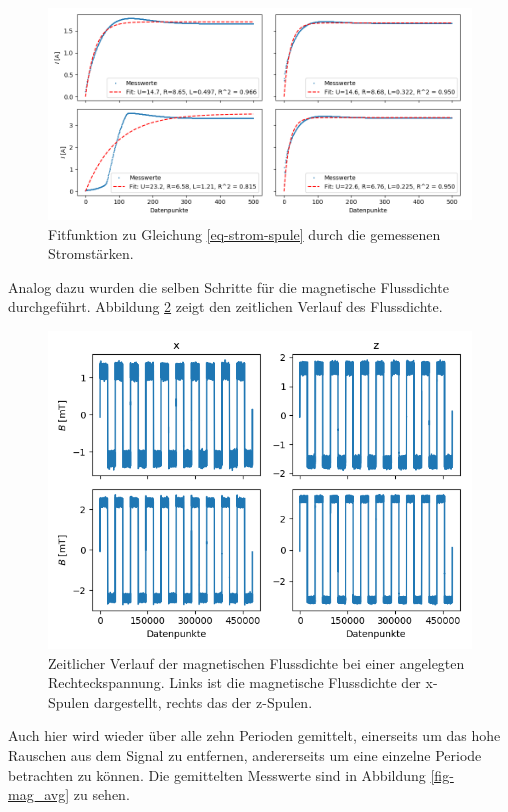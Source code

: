 \documentclass[page,pdftex,12pt,a4paper,twoside,openright]{scrbook}
\begin{document}
\begin{figure}[h]
\centering
\includegraphics[width=\textwidth]{img/strom_fit.png}
\caption{\label{fig-stromfit}
Fitfunktion zu Gleichung \ref{eq-strom-spule} durch die gemessenen Stromstärken.}
\end{figure}


Analog dazu wurden die selben Schritte für die magnetische Flussdichte durchgeführt. Abbildung \ref{fig-mag} zeigt den zeitlichen Verlauf des Flussdichte.

\begin{figure}[H]
\centering
\includegraphics[width=\textwidth]{img/mag.png}
\caption{\label{fig-mag}
Zeitlicher Verlauf der magnetischen Flussdichte bei einer angelegten Rechteckspannung. Links ist die magnetische Flussdichte der x-Spulen dargestellt, rechts das der z-Spulen.}
\end{figure}

Auch hier wird wieder über alle zehn Perioden gemittelt, einerseits um das hohe Rauschen aus dem Signal zu entfernen, andererseits um eine einzelne Periode betrachten zu können. Die gemittelten Messwerte sind in Abbildung \ref{fig-mag_avg} zu sehen.
\end{document}
